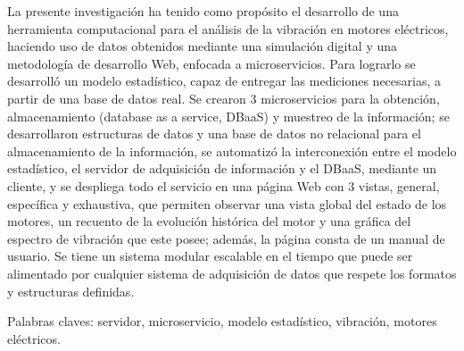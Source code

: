 La presente investigación ha tenido como propósito el desarrollo de una
herramienta computacional para el análisis de la vibración en motores
eléctricos, haciendo uso de  datos obtenidos mediante una simulación
digital y una metodología de desarrollo
Web, enfocada a microservicios. Para lograrlo se desarrolló un modelo
estadístico, capaz de entregar las mediciones necesarias, a partir de una base
de datos real. Se
crearon 3 microservicios para la obtención, almacenamiento
(database as a service, DBaaS) y muestreo  de la información;
se desarrollaron estructuras de datos y una base de
datos no relacional para el almacenamiento de la información, se automatizó
la interconexión entre el modelo estadístico, el servidor de adquisición de
información y el DBaaS, mediante un cliente, y se despliega todo
el servicio en una página Web con 3 vistas, general, específica y
exhaustiva, que permiten observar una vista global del estado de
los motores, un recuento de la evolución histórica del
motor   y una gráfica  del espectro de
vibración que este posee;
además, la página consta de un  manual de usuario.
Se tiene un sistema  modular
 escalable en el tiempo que puede ser alimentado por cualquier sistema de
adquisición de datos que respete los formatos y estructuras definidas.

Palabras claves: servidor, microservicio, modelo estadístico, vibración,
motores eléctricos.

